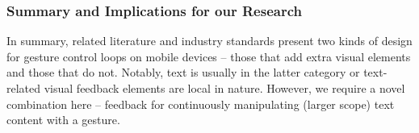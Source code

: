 \subsubsection{Summary and Implications for our Research}
In summary, related literature and industry standards present two kinds of design for gesture control loops on mobile devices -- those that add extra visual elements and those that do not. 
Notably, text is usually in the latter category or text-related visual feedback elements are local in nature. However, we require a novel combination here -- feedback for continuously manipulating (larger scope) text content with a gesture. 






















